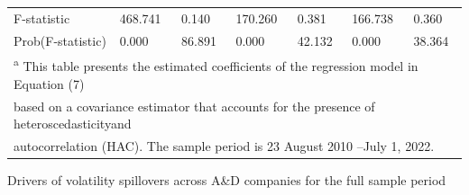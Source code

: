 \documentclass[
  number]{elsarticle}
\begin{document}
\begin{table}[H]
{\begin{tabular}[t]{lllllll}
F-statistic & 468.741 & 0.140 & 170.260 & 0.381 & 166.738 & 0.360\\
Prob(F-statistic) & 0.000 & 86.891 & 0.000 & 42.132 & 0.000 & 38.364\\
\bottomrule
\multicolumn{7}{l}{\textsuperscript{a} This table presents the estimated coefficients of the regression model in Equation (7)}\\
\multicolumn{7}{l}{based on a covariance estimator that accounts for the presence of heteroscedasticityand}\\
\multicolumn{7}{l}{autocorrelation (HAC). The sample period is 23 August 2010 –July 1, 2022.}\\
\end{tabular}}
\end{table}

\hypertarget{tbl-reg2}{}
\begin{table}[H]
\caption{\label{tbl-reg2}Drivers of volatility spillovers across A\&D companies for the full
sample period }\tabularnewline


\end{table}
\end{document}

